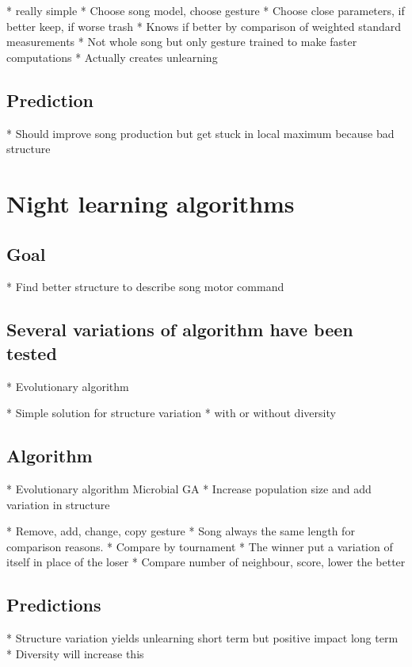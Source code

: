 \documentclass{report}
\begin{document}
  * really simple
  * Choose song model, choose gesture
  * Choose close parameters, if better keep, if worse trash
  * Knows if better by comparison of weighted standard measurements
  * Not whole song but only gesture trained to make faster computations
        * Actually creates unlearning

  \subsection{Prediction}\label{prediction}
  * Should improve song production but get stuck in local maximum because
  bad structure
\section{Night learning algorithms}\label{night-learning-algorithms}

\subsection{Goal}\label{goal-1}

  * Find better structure to describe song motor command
\subsection{Several variations of algorithm have been
tested}\label{several-variations-of-algorithm-have-been-tested}

  * Evolutionary algorithm

        * Simple solution for structure variation
    * with or without diversity
\subsection{Algorithm}\label{algorithm}

  * Evolutionary algorithm Microbial GA
  * Increase population size and add variation in structure

        * Remove, add, change, copy gesture
      * Song always the same length for comparison reasons.
    * Compare by tournament
        * The winner put a variation of itself in place of the loser
        * Compare number of neighbour, score, lower the better
\subsection{Predictions}\label{predictions}

  * Structure variation yields unlearning short term but positive impact
  long term
  * Diversity will increase this
\end{document}

